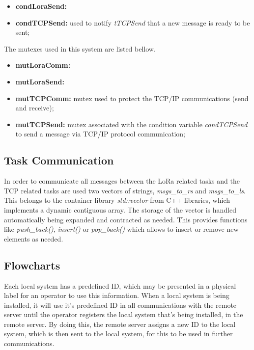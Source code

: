 \begin{itemize}
	\item \textbf{condLoraSend:}
	
	\item \textbf{condTCPSend:} used to notify \textit{tTCPSend} that a new message is ready to be sent;
		
\end{itemize}

The mutexes used in this system are listed bellow.

\begin{itemize}
	\item \textbf{mutLoraComm:}
	\item \textbf{mutLoraSend:}	
	
	\item \textbf{mutTCPComm:} mutex used to protect the TCP/IP communications (send and receive);
	\item \textbf{mutTCPSend:} mutex associated with the condition variable \textit{condTCPSend} to send a message via TCP/IP protocol communication;
\end{itemize}


\subsection{Task Communication}
In order to communicate all messages between the LoRa related tasks and the TCP related tasks are used two vectors of strings, \textit{msgs\_to\_rs} and \textit{msgs\_to\_ls}. This belongs to the container library \textit{std::vector} from C++ libraries, which implements a dynamic contiguous array. The storage of the vector is handled automatically being expanded and contracted as needed. This provides functions like \textit{push\_back()}, \textit{insert()} or \textit{pop\_back()} which allows to insert or remove new elements as needed.

\subsection{Flowcharts}
Each local system has a predefined ID, which may be presented in a physical label for an operator to use this information. When a local system is being installed, it will use it's predefined ID in all communications with the remote server until the operator registers the local system that's being installed, in the remote server. By doing this, the remote server assigns a new ID to the local system, which is then sent to the local system, for this to be used in further communications.

